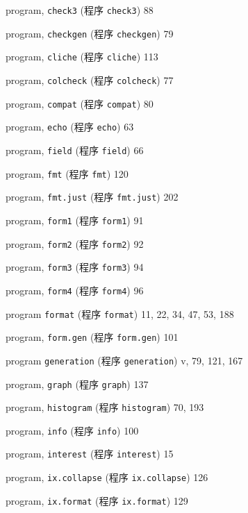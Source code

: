 \begin{multicols}{2}
\hangindent=2pc  program, \verb'check3' (程序 \verb'check3') 88

\hangindent=2pc  program, \verb'checkgen' (程序 \verb'checkgen') 79

\hangindent=2pc  program, \verb'cliche' (程序 \verb'cliche') 113

\hangindent=2pc  program, \verb'colcheck' (程序 \verb'colcheck') 77

\hangindent=2pc  program, \verb'compat' (程序 \verb'compat') 80

\hangindent=2pc  program, \verb'echo' (程序 \verb'echo') 63

\hangindent=2pc  program, \verb'field' (程序 \verb'field') 66

\hangindent=2pc  program, \verb'fmt' (程序 \verb'fmt') 120

\hangindent=2pc  program, \verb'fmt.just' (程序 \verb'fmt.just')
202

\hangindent=2pc  program, \verb'form1' (程序 \verb'form1') 91

\hangindent=2pc  program, \verb'form2' (程序 \verb'form2') 92

\hangindent=2pc  program, \verb'form3' (程序 \verb'form3') 94

\hangindent=2pc  program, \verb'form4' (程序 \verb'form4') 96

\hangindent=2pc  program \verb'format' (程序 \verb'format')
11, 22, 34, 47, 53, 188

\hangindent=2pc  program, \verb'form.gen' (程序 \verb'form.gen') 101

\hangindent=2pc  program \verb'generation' (程序 \verb'generation')
v, 79, 121, 167

\hangindent=2pc  program, \verb'graph' (程序 \verb'graph') 137

\hangindent=2pc  program, \verb'histogram' (程序 \verb'histogram')
70, 193

\hangindent=2pc  program, \verb'info' (程序 \verb'info') 100

\hangindent=2pc  program, \verb'interest' (程序 \verb'interest') 15

\hangindent=2pc  program, \verb'ix.collapse' (程序
\verb'ix.collapse') 126

\hangindent=2pc  program, \verb'ix.format' (程序 \verb'ix.format')
129


\end{multicols}
